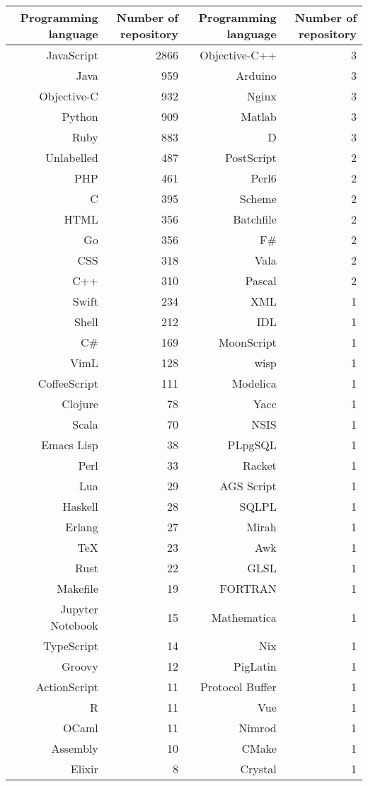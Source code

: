 \documentclass[12pt,oneside,final]{vlsithesis}
\begin{document}
\begin{table*}
	\renewcommand\arraystretch{0.65}
	\small \centering
	\begin{tabular}{rr|rr} \toprule
		Programming language & Number of repository & Programming language & Number of repository \\ \hline
		JavaScript&2866&Objective-C++&3 \\  
		Java&959&Arduino&3 \\  
		Objective-C&932&Nginx&3 \\  
		Python&909&Matlab&3 \\  
		Ruby&883&D&3 \\  
		Unlabelled&487&PostScript&2 \\  
		PHP&461&Perl6&2 \\  
		C&395&Scheme&2 \\  
		HTML&356&Batchfile&2 \\  
		Go&356&F\#&2 \\  
		CSS&318&Vala&2 \\  
		C++&310&Pascal&2 \\  
		Swift&234&XML&1 \\  
		Shell&212&IDL&1 \\  
		C\#&169&MoonScript&1 \\  
		VimL&128&wisp&1 \\  
		CoffeeScript&111&Modelica&1 \\  
		Clojure&78&Yacc&1 \\  
		Scala&70&NSIS&1 \\  
		Emacs Lisp&38&PLpgSQL&1 \\  
		Perl&33&Racket&1 \\  
		Lua&29&AGS Script&1 \\  
		Haskell&28&SQLPL&1 \\  
		Erlang&27&Mirah&1 \\  
		TeX&23&Awk&1 \\  
		Rust&22&GLSL&1 \\  
		Makefile&19&FORTRAN&1 \\  
		Jupyter Notebook&15&Mathematica&1 \\  
		TypeScript&14&Nix&1 \\  
		Groovy&12&PigLatin&1 \\  
		ActionScript&11&Protocol Buffer&1 \\  
		R&11&Vue&1 \\  
		OCaml&11&Nimrod&1 \\  
		Assembly&10&CMake&1 \\  
		Elixir&8&Crystal&1 \\  

\end{tabular}
\end{table*}
\end{document}
